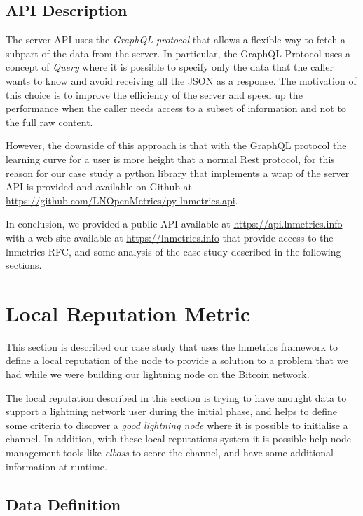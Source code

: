 \subsection{API Description}

The server API uses the \emph{GraphQL protocol} that allows a flexible way to fetch
a subpart of the data from the server. In particular, the GraphQL Protocol uses
a concept of \emph{Query} where it is possible to specify only the data that the 
caller wants to know and avoid receiving all the JSON as a response. The motivation of this 
choice is to improve the efficiency of the server and speed up the performance when the caller needs 
access to a subset of information and not to the full raw content. 

However, the downside of this approach is that with the GraphQL protocol the learning 
curve for a user is more height that a normal Rest protocol, for this reason for our
case study a python library that implements a wrap of the server API is provided 
and available on Github at \url{https://github.com/LNOpenMetrics/py-lnmetrics.api}. 

In conclusion, we provided a public API available at \url{https://api.lnmetrics.info} with 
a web site available at \url{https://lnmetrics.info} that provide access to the 
lnmetrics RFC, and some analysis of the case study described in the 
following sections.

\section{Local Reputation Metric}
\label{sec:demo}

This section is described our case study that uses the lnmetrics framework to 
define a local reputation of the node to provide a solution to a problem 
that we had while we were building our lightning node on the Bitcoin network.

The local reputation described in this section is trying to have anought data 
to support a lightning network user during the initial phase, and 
helps to define some criteria to discover a \emph{good lightning node} 
where it is possible to initialise a channel. In addition, with these local reputations 
system it is possible help node management tools like \emph{clboss}\cite{clboss}
to score the channel, and have some additional information at runtime.

\subsection{Data Definition}
\label{sec:data_definition_datadef}

